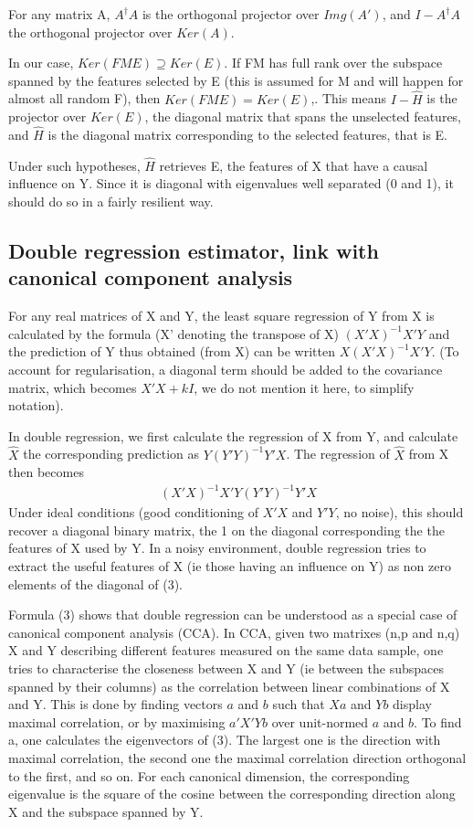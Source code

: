\documentclass{article}
\begin{document}
For any matrix A, $A^\dagger A$ is the orthogonal projector over $Img(A')$, and $I-A^\dagger A$ the orthogonal projector over $Ker(A)$. 

In our case, $Ker(FME)\supseteq Ker(E)$. If FM has full rank over the subspace spanned by the features selected by E (this is assumed for M and will happen for almost all random F), then $Ker(FME) = Ker(E)$,. This means $I - \hat H$ is the projector over $Ker(E)$, the diagonal matrix that spans the unselected features, and $\hat H$ is the diagonal matrix corresponding to the selected features, that is E.

Under such hypotheses, $\hat H$ retrieves E, the features of X that have a causal influence on Y. Since it is diagonal with eigenvalues well separated (0 and 1), it should do so in a fairly resilient way.

\subsection{Double regression estimator, link with canonical component analysis}

For any real matrices of X and Y, the least square regression of Y from X is calculated by the formula (X' denoting the transpose of X) $(X'X)^{-1} X'Y$ and the prediction of Y thus obtained (from X) can be written $X(X'X)^{-1} X'Y$. (To account for regularisation, a diagonal term should be added to the covariance matrix, which becomes $X'X+kI$, we do not mention it here, to simplify notation).
 
In double regression, we first calculate the regression of X from Y, and calculate $\hat X$ the corresponding prediction as $Y(Y'Y)^{-1} Y'X$. The regression of $\hat X$ from X then becomes
\begin{equation}
\begin{aligned}
(X'X)^{-1} X'Y(Y'Y)^{-1} Y'X
\end{aligned}
\end{equation}
Under ideal conditions (good conditioning of $X'X$ and $Y'Y$, no noise), this should recover a diagonal binary matrix, the 1 on the diagonal corresponding the the features of X used by Y. In a noisy environment, double regression tries to extract the useful features of X (ie those having an influence on Y) as non zero elements of the diagonal of (3).

Formula (3) shows that double regression can be understood as a special case of canonical component analysis (CCA). In CCA, given two matrixes (n,p and n,q) X and Y describing different features measured on the same data sample, one tries to characterise the closeness between X and Y (ie between the subspaces spanned by their columns) as the correlation between linear combinations of X and Y. This is done by finding vectors $a$ and $b$ such that $Xa$ and $Yb$ display maximal correlation, or by maximising $a'X'Yb$ over unit-normed $a$ and $b$. To find a, one calculates the eigenvectors of (3). The largest one is the direction with maximal correlation, the second one the maximal correlation direction orthogonal to the first, and so on. For each canonical dimension, the corresponding eigenvalue is the square of the cosine between the corresponding direction along X and the subspace spanned by Y.  
\end{document}
